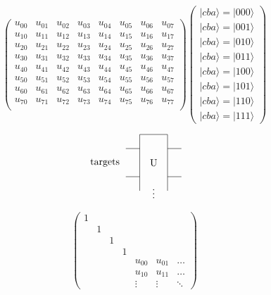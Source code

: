 \documentclass{article}
\begin{document}
\[
\begin{pmatrix}
u_{00} & u_{01} & u_{02} & u_{03} & u_{04} & u_{05} & u_{06} & u_{07} \\
u_{10} & u_{11} & u_{12} & u_{13} & u_{14} & u_{15} & u_{16} & u_{17} \\
u_{20} & u_{21} & u_{22} & u_{23} & u_{24} & u_{25} & u_{26} & u_{27} \\
u_{30} & u_{31} & u_{32} & u_{33} & u_{34} & u_{35} & u_{36} & u_{37} \\
u_{40} & u_{41} & u_{42} & u_{43} & u_{44} & u_{45} & u_{46} & u_{47} \\
u_{50} & u_{51} & u_{52} & u_{53} & u_{54} & u_{55} & u_{56} & u_{57} \\
u_{60} & u_{61} & u_{62} & u_{63} & u_{64} & u_{65} & u_{66} & u_{67} \\
u_{70} & u_{71} & u_{72} & u_{73} & u_{74} & u_{75} & u_{76} & u_{77} \\
\end{pmatrix}
\begin{pmatrix}
|cba\rangle = |000\rangle \\
|cba\rangle = |001\rangle \\
|cba\rangle = |010\rangle \\
|cba\rangle = |011\rangle \\
|cba\rangle = |100\rangle \\
|cba\rangle = |101\rangle \\
|cba\rangle = |110\rangle \\
|cba\rangle = |111\rangle 
\end{pmatrix}
\]
\pagebreak

\[
             \begin{tikzpicture}[scale=.5]
             \node[draw=none] at (-3.5, 1) {targets};

             \draw (-2,0) -- (-1, 0);
             \draw (1, 0) -- (2, 0);
             \draw (-2,2) -- (-1, 2);
             \draw (1, 2) -- (2, 2);
             \draw (-1,-1)--(-1,3)--(1,3)--(1,-1);
             \node[draw=none] at (0, 1) {U};
             \node[draw=none] at (0, -1) {$\vdots$};
             
             \end{tikzpicture}
 \]
\pagebreak

\[
\begin{pmatrix}
1 \\
& 1 \\\
& & 1 \\
& & & 1 \\
& & & & u_{00} & u_{01} & \dots  \\
& & & & u_{10} & u_{11} & \dots \\
& & & & \vdots & \vdots & \ddots
\end{pmatrix}
\]
\pagebreak
\end{document}
